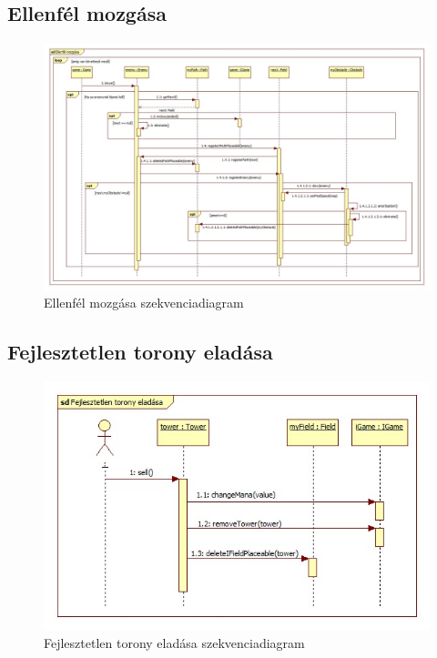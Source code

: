 \subsection{Ellenfél mozgása}
\begin{figure}[H]
\begin{center}
\includegraphics[width=17cm]{chapters/chapter05/images/sd_Ellenfel_mozgasa.jpg}
\caption{Ellenfél mozgása szekvenciadiagram}
\label{fig:sd_Ellenfel_mozgasa}
\end{center}
\end{figure}

\subsection{Fejlesztetlen torony eladása}
\begin{figure}[H]
\begin{center}
\includegraphics[width=17cm]{chapters/chapter05/images/sd_Fejlesztetlen_torony_eladasa.jpg}
\caption{Fejlesztetlen torony eladása szekvenciadiagram}
\label{fig:sd_Fejlesztetlen_torony_eladasa}
\end{center}
\end{figure}

